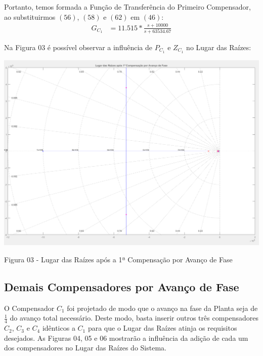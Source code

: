 \documentclass[a4paper]{article}
\begin{document}
 	\vspace{0.5em}
 	\par Portanto, temos formada a Função de Transferência do Primeiro Compensador, ao substituirmos $(56)$, $(58)$ e $(62)$ em $(46)$:
 	\begin{align}
 	G_{C_1} &= 11.515 * \frac{s+10000}{s+63534.67}
 	\end{align}
 	\vspace{0.5em}
 	\par Na Figura 03 é possível observar a influência de ${P_{C_1}}$ e $Z_{C_1}$ no Lugar das Raízes:
	\begin{center}
 		\includegraphics[width=40em,keepaspectratio]{lugar_das_raizes_1_compensacao}
 		\par Figura 03 - Lugar das Raízes após a 1ª Compensação por Avanço de Fase
 	\end{center}
 
 \subsection{Demais Compensadores por Avanço de Fase}
 \par O Compensador $C_1$ foi projetado de modo que o avanço na fase da Planta seja de $\frac{1}{4}$ do avanço total necessário. Deste modo, basta inserir outros três compensadores $C_2$, $C_3$ e $C_4$ idênticos a $C_1$ para que o Lugar das Raízes atinja os requisitos desejados. As Figuras 04, 05 e 06 mostrarão a influência da adição de cada um dos compensadores no Lugar das Raízes do Sistema.
\end{document}
